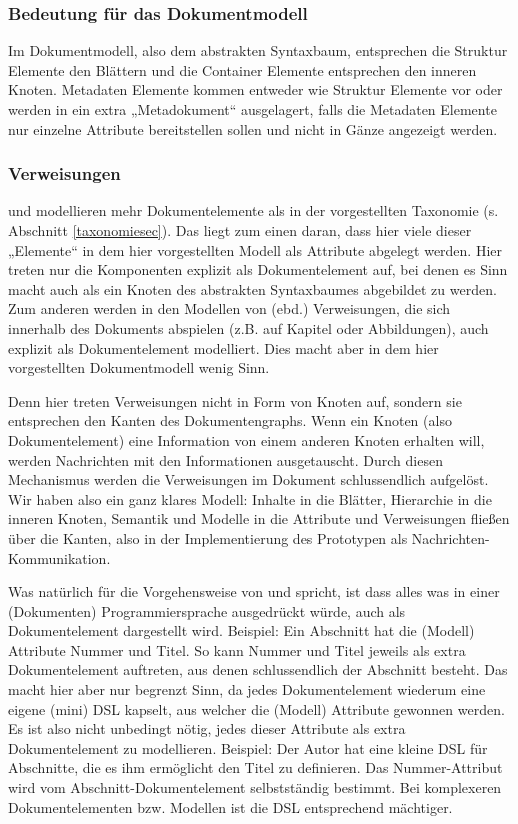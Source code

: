  
\subsubsection{Bedeutung für das Dokumentmodell}\label{}

 
Im Dokumentmodell, also dem abstrakten Syntaxbaum, entsprechen die Struktur Elemente den Blättern und die Container Elemente entsprechen den inneren Knoten. Metadaten Elemente kommen entweder wie Struktur Elemente vor oder werden in ein extra „Metadokument“ ausgelagert, falls die Metadaten Elemente nur einzelne Attribute bereitstellen sollen und nicht in Gänze angezeigt werden.

 
\subsubsection{Verweisungen}\label{}

 
\citep{Peroni} und \citep{NISO} modellieren mehr Dokumentelemente als in der vorgestellten Taxonomie (s. Abschnitt \ref{taxonomiesec}). Das liegt zum einen daran, dass hier viele dieser „Elemente“ in dem hier vorgestellten Modell als Attribute abgelegt werden. Hier treten nur die Komponenten explizit als Dokumentelement auf, bei denen es Sinn macht auch als ein Knoten des abstrakten Syntaxbaumes abgebildet zu werden. Zum anderen werden in den Modellen von (ebd.) Verweisungen, die sich innerhalb des Dokuments abspielen (z.B. auf Kapitel oder Abbildungen), auch explizit als Dokumentelement modelliert. Dies macht aber in dem hier vorgestellten Dokumentmodell wenig Sinn.

 
Denn hier treten Verweisungen nicht in Form von Knoten auf, sondern sie entsprechen den Kanten des Dokumentengraphs. Wenn ein Knoten (also Dokumentelement) eine Information von einem anderen Knoten erhalten will, werden Nachrichten mit den Informationen ausgetauscht. Durch diesen Mechanismus werden die Verweisungen im Dokument schlussendlich aufgelöst. Wir haben also ein ganz klares Modell: Inhalte in die Blätter, Hierarchie in die inneren Knoten, Semantik und Modelle in die Attribute und Verweisungen fließen über die Kanten, also in der Implementierung des Prototypen als Nachrichten-Kommunikation.

 
Was natürlich für die Vorgehensweise von \citep{Peroni} und \citep{NISO} spricht, ist dass alles was in einer (Dokumenten) Programmiersprache ausgedrückt würde, auch als Dokumentelement dargestellt wird. Beispiel: Ein Abschnitt hat die (Modell) Attribute Nummer und Titel. So kann Nummer und Titel jeweils als extra Dokumentelement auftreten, aus denen schlussendlich der Abschnitt besteht. Das macht hier aber nur begrenzt Sinn, da jedes Dokumentelement wiederum eine eigene (mini) DSL kapselt, aus welcher die (Modell) Attribute gewonnen werden. Es ist also nicht unbedingt nötig, jedes dieser Attribute als extra Dokumentelement zu modellieren. Beispiel: Der Autor hat eine kleine DSL für Abschnitte, die es ihm ermöglicht den Titel zu definieren. Das Nummer-Attribut wird vom Abschnitt-Dokumentelement selbstständig bestimmt. Bei komplexeren Dokumentelementen bzw. Modellen ist die DSL entsprechend mächtiger.

